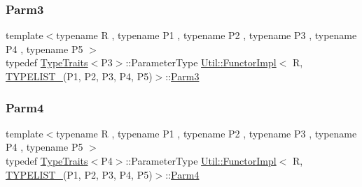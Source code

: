 \mbox{\label{classUtil_1_1FunctorImpl_3_01R_00_01TYPELIST__5_07P1_00_01P2_00_01P3_00_01P4_00_01P5_08_4_a5ad1ce88b66a6e09b4a462f27ebeb665}} 
\subsubsection{\texorpdfstring{Parm3}{Parm3}\hspace{0.1cm}{\footnotesize\ttfamily [3/3]}}
{\footnotesize\ttfamily template$<$typename R , typename P1 , typename P2 , typename P3 , typename P4 , typename P5 $>$ \\
typedef \mbox{\hyperlink{classUtil_1_1TypeTraits}{Type\+Traits}}$<$P3$>$\+::Parameter\+Type \mbox{\hyperlink{classUtil_1_1FunctorImpl}{Util\+::\+Functor\+Impl}}$<$ R, \mbox{\hyperlink{adat__devel__install_2include_2adat_2typelist_8h_aad5d9b3c82c8503c85c625acd41c0a2f}{T\+Y\+P\+E\+L\+I\+S\+T\+\_}}(P1, P2, P3, P4, P5)$>$\+::\mbox{\hyperlink{structUtil_1_1Private_1_1FunctorImplBase_a052148e627fd4caecbcffdbdf1033dbb}{Parm3}}}

\mbox{\label{classUtil_1_1FunctorImpl_3_01R_00_01TYPELIST__5_07P1_00_01P2_00_01P3_00_01P4_00_01P5_08_4_a9fb458de88c9f2050fd168a315f93033}} 
\subsubsection{\texorpdfstring{Parm4}{Parm4}\hspace{0.1cm}{\footnotesize\ttfamily [1/3]}}
{\footnotesize\ttfamily template$<$typename R , typename P1 , typename P2 , typename P3 , typename P4 , typename P5 $>$ \\
typedef \mbox{\hyperlink{classUtil_1_1TypeTraits}{Type\+Traits}}$<$P4$>$\+::Parameter\+Type \mbox{\hyperlink{classUtil_1_1FunctorImpl}{Util\+::\+Functor\+Impl}}$<$ R, \mbox{\hyperlink{adat__devel__install_2include_2adat_2typelist_8h_aad5d9b3c82c8503c85c625acd41c0a2f}{T\+Y\+P\+E\+L\+I\+S\+T\+\_}}(P1, P2, P3, P4, P5)$>$\+::\mbox{\hyperlink{structUtil_1_1Private_1_1FunctorImplBase_a1ad7fe3f243480c44a610927ebe76762}{Parm4}}}

